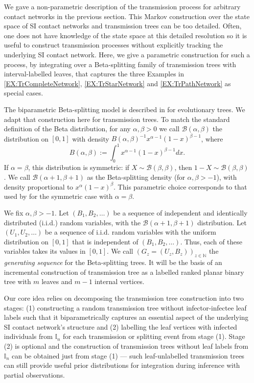 \documentclass[review]{elsarticle}
\numberwithin{equation}{section}
\let\orgautoref\autoref
\renewcommand{\autoref}
        {\def\equationautorefname{Eq.}%
         \def\figureautorefname{Fig.}%
         \def\subfigureautorefname{Fig.}%
         \def\sectionautorefname{Sect.}%
         \def\subsectionautorefname{Sect.}%
         \def\subsubsectionautorefname{Sect.}%
         \def\Itemautorefname{item}%
         \def\tableautorefname{Table}%
         \def\propositionautorefname{Prop.}%
         \def\corollaryautorefname{Corollary}%
         \def\theoremautorefname{Theorem}%
         \def\remarkautorefname{Remark}%
         \def\lemmaautorefname{Lemma}%
         \def\proofofautorefname{Proof}%
         \def\exampleautorefname{Example}%
         \orgautoref}
\providecommand{\autorefs}
        {\def\equationautorefname{Eqs.}%
         \def\figureautorefname{Figs.}%
         \def\subfigureautorefname{Figs.}%
         \def\sectionautorefname{Sects.}%
         \def\subsectionautorefname{Sects.}%
         \def\subsubsectionautorefname{Sects.}%
         \def\Itemautorefname{items}%
         \def\tableautorefname{Tables}%
         \def\propositionautorefname{Props.}%
         \def\theoremautorefname{Theorems}%
         \def\theoremautorefname{Remarks}%
         \def\lemmaautorefname{Lemmas}%
         \def\proofofautorefname{Proofs}%
         \def\exampleautorefname{Examples}%
         \orgautoref}
\newcommand{\bI}{{\mathbb I}}
\newcommand{\bN}{{\mathbb N}}
\def\calB{\mathcal{B}}
\begin{document}
We gave a non-parametric description of the transmission process for arbitrary contact networks in the previous section.  
This Markov construction over the state space of SI contact networks and transmission trees can be too detailed.  
Often, one does not have knowledge of the state space at this detailed resolution so it is useful to construct transmission processes without explicitly tracking the underlying SI contact network.  
Here, we give a parametric construction for such a process, by integrating over a Beta-splitting family of transmission trees with interval-labelled leaves, that captures the three Examples in \autorefs{EX:TrCompleteNetwork}, \ref{EX:TrStarNetwork} and \ref{EX:TrPathNetwork} as special cases.

The biparametric Beta-splitting model is described in \cite{SainudiinVeber2016} for evolutionary trees.  
We adapt that construction here for transmission trees.   
To match the standard definition of the Beta distribution, for any $\alpha,\beta>0$ we call $\calB(\alpha,\beta)$ the distribution on $[0,1]$ with density $B(\alpha,\beta)^{-1}x^{\alpha-1}(1-x)^{\beta-1}$, where
\begin{equation}\label{notation beta}
B(\alpha,\beta) := \int_0^1 x^{\alpha-1}(1-x)^{\beta-1}dx.
\end{equation}
If $\alpha=\beta$, this distribution is symmetric: if $X\sim \calB(\beta,\beta)$, then $1-X \sim \calB(\beta,\beta)$.  
We call $\calB(\alpha+1,\beta+1)$ as the Beta-splitting density (for $\alpha,\beta>-1$), with density proportional to $x^\alpha(1-x)^\beta$. 
This parametric choice corresponds to that used by \cite{Aldous2001} for the symmetric case with $\alpha=\beta$.


We fix $\alpha,\beta>-1$.  
Let $(B_1,B_2,\ldots)$ be a sequence of independent and identically distributed (i.i.d.) random variables, with the $\calB(\alpha+1,\beta+1)$ distribution.  
Let $(U_1,U_2,\ldots)$ be a sequence of i.i.d. random variables with the uniform distribution on $[0,1]$ that is independent of $(B_1,B_2,\ldots)$.  
Thus, each of these variables takes its values in $[0,1]$.  
We call $(G_z = (U_z,B_z))_{z\in \bN}$ the \emph{generating sequence} for the Beta-splitting trees.  
It will be the basis of an incremental construction of transmission tree as a labelled ranked planar binary tree with $m$ leaves and $m-1$ internal vertices.

Our core idea relies on decomposing the transmission tree construction into two stages: 
(1) constructing a random transmission tree without infector-infectee leaf labels such that 
it biparametrically captures an essential aspect of the underlying SI contact network's structure and 
(2) labelling the leaf vertices with infected individuals from $\bI_n$ for each transmission or splitting event from stage (1).  
Stage (2) is optional and the construction of transmission trees without leaf labels from $\bI_n$ can be obtained just from stage (1) --- such leaf-unlabelled transmission trees can still provide useful prior distributions for integration during inference with partial observations.
\end{document}
